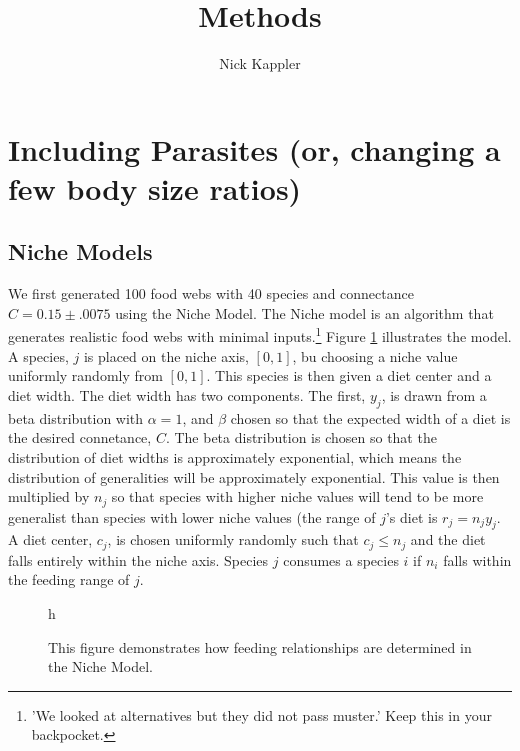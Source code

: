 \documentclass[11pt]{amsart}
\title{Methods}
\author{Nick Kappler}
\begin{document}
\maketitle
\section{Including Parasites (or, changing a few body size ratios)}


\subsection{Niche Models\label{sec:structure}}

We first generated 100 food webs with 40 species and connectance $C=0.15\pm .0075$ using the Niche Model.  The Niche model is an algorithm that generates realistic food webs with minimal inputs.\footnote{'We looked at alternatives but they did not pass muster.' Keep this in your backpocket.}  Figure \ref{fig:nicheModel} illustrates the model.  A species, $j$ is placed on the niche axis, $[0,1]$, bu choosing a niche value uniformly randomly from $[0,1]$.  This species is then given a diet center and a diet width.  The diet width has two components.  The first, $y_j$, is drawn from a beta distribution with $\alpha = 1$, and $\beta$ chosen so that the expected width of a diet is the desired connetance, $C$.  The beta distribution is chosen so that the distribution of diet widths is approximately exponential, which means the distribution of generalities will be approximately exponential.  This value is then multiplied by $n_j$ so that species with higher niche values will tend to be more generalist than species with lower niche values (the range of $j$'s diet is $r_j = n_jy_j$.  A diet center, $c_j$, is chosen uniformly randomly such that $c_j \leq n_j$ and the diet falls entirely within the niche axis.  Species $j$ consumes a species $i$ if $n_i$ falls within the feeding range of $j$.  


\begin{figure}{h}
\caption{This figure demonstrates how feeding relationships are determined in the Niche Model.\label{fig:nicheModel}}
\end{figure}
\end{document}
